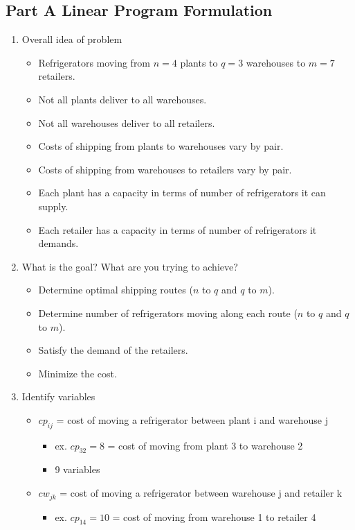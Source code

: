 \documentclass[../report/main.tex]{subfiles}
\begin{document}
\subsection*{Part A Linear Program Formulation}
\begin{enumerate}[1.]
	\item Overall idea of problem
	\begin{itemize}
		\item Refrigerators moving from $n=4$ plants to $q=3$ warehouses to $m=7$ retailers.
		\item Not all plants deliver to all warehouses.
		\item Not all warehouses deliver to all retailers.
		\item Costs of shipping from plants to warehouses vary by pair.
		\item Costs of shipping from warehouses to retailers vary by pair.
		\item Each plant has a capacity in terms of number of refrigerators it can supply.
		\item Each retailer has a capacity in terms of number of refrigerators it demands.
	\end{itemize}
	\item What is the goal?  What are you trying to achieve?
	\begin{itemize}
		\item Determine optimal shipping routes ($n$ to $q$ and $q$ to $m$).
		\item Determine number of refrigerators moving along each route ($n$ to $q$ and $q$ to $m$).
		\item Satisfy the demand of the retailers.
		\item Minimize the cost.
	\end{itemize}
	\item Identify variables
	\begin{itemize}
		\item $cp_{ij}$ = cost of moving a refrigerator between plant i and warehouse j
		\begin{itemize}
			\item   ex. $cp_{32} = 8$ = cost of moving from plant 3 to warehouse 2
			\item   9 variables
		\end{itemize}
		\item $cw_{jk}$ = cost of moving a refrigerator between warehouse j and retailer k
		\begin{itemize}
  			\item  ex. $cp_{14} = 10$ = cost of moving from warehouse 1 to retailer 4

\end{itemize}
\end{itemize}
\end{enumerate}
\end{document}
